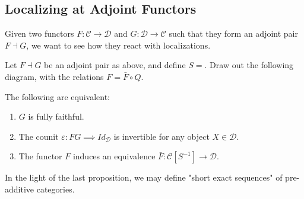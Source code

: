 \documentclass[../../../thesis.tex]{subfiles}
\begin{document}
        \subsection{Localizing at Adjoint Functors}

            Given two functors $F : \mathcal{C} \rightarrow \mathcal{D}$ and $G : \mathcal{D} \rightarrow \mathcal{C}$ such that they form an adjoint pair $F \dashv G$, we want to see how they react with localizations.

            \begin{proposition}
                Let $F \dashv G$ be an adjoint pair as above, and define $S = $. Draw out the following diagram, with the relations $F = \bar{F}\circ Q$.
                \begin{center}
                \end{center}
                The following are equivalent:
                \begin{enumerate}
                    \item $G$ is fully faithful.
                    \item The counit $\varepsilon : FG \implies Id_\mathcal{D}$ is invertible for any object $X\in \mathcal{D}$.
                    \item The functor $F$ induces an equivalence $\bar{F}:\mathcal{C}[S^{-1}] \rightarrow \mathcal{D}$.
                \end{enumerate}
            \end{proposition}
        
            In the light of the last proposition, we may define "short exact sequences" of pre-additive categories.
\end{document}
